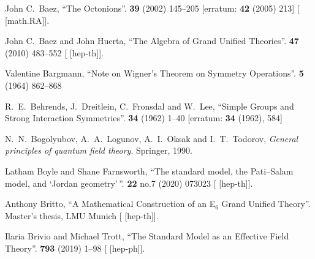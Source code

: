 \begin{thebibliography}{99}

John C.~Baez,
``The Octonions''.
 \textbf{39} (2002) 145--205
[erratum:  \textbf{42} (2005) 213]
{\tt{}}
[ [math.RA]].
  
John C.~Baez and John Huerta,
``The Algebra of Grand Unified Theories''.
 \textbf{47} (2010) 483--552
{\tt{}}
[ [hep-th]].

Valentine Bargmann,
``Note on Wigner's Theorem on Symmetry Operations''.
 \textbf{5} (1964) 862--868
{\tt{}}

R.~E.~Behrends, J.~Dreitlein, C.~Fronsdal and W.~Lee,
``Simple Groups and Strong Interaction Symmetries''.
 \textbf{34} (1962) 1--40
[erratum:  \textbf{34} (1962), 584]
{\tt{}}

N.~N.~Bogolyubov, A.~A.~Logunov, A.~I.~Oksak and I.~T.~Todorov,
\textit{General principles of quantum field theory}.
Springer, 1990.

Latham Boyle and Shane Farnsworth,
``The standard model, the Pati--Salam model, and `Jordan geometry'\,''.
 \textbf{22} no.7 (2020) 073023
{\tt{}}
[ [hep-th]].

Anthony Britto,
``A Mathematical Construction of an E$_{6}$ Grand Unified Theory''.
Master's thesis, LMU Munich
[ [hep-th]].

Ilaria Brivio and Michael Trott,
``The Standard Model as an Effective Field Theory''.
 \textbf{793} (2019) 1--98
{\tt{}}
[ [hep-ph]].


\end{thebibliography}
